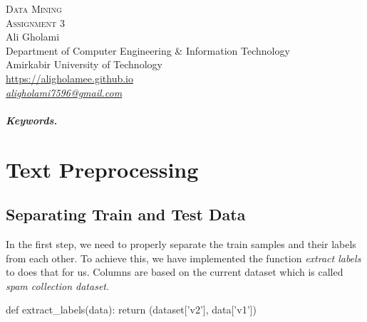 \documentclass[12pt]{article}
\numberwithin{equation}{section}
\numberwithin{table}{section}
\numberwithin{figure}{section}
\begin{document}

\begin{center}
\textsc{\Huge Data Mining} \\[2pt]
	\textsc{\Large Assignment 3}\\
	\vspace{0.5cm}
  Ali Gholami \\[6pt]
  Department of Computer Engineering \& Information Technology\\
  Amirkabir University of Technology  \\[6pt]
  \def\UrlFont{\em}
  \url{https://aligholamee.github.io}\\
\href{mailto:aligholami7596@gmail.com}{\textit{aligholami7596@gmail.com}}
\end{center}

\begin{abstract}

\end{abstract} 

\subparagraph{Keywords.} \textit{}

\section{Text Preprocessing}
\subsection{Separating Train and Test Data}
In the first step, we need to properly separate the train samples and their labels from each other. To achieve this, we have implemented the function \textit{extract labels} to does that for us. Columns are based on the current dataset which is called \textit{spam collection dataset}.

\begin{python}
	def extract_labels(data):
		return (dataset['v2'], data['v1'])
\end{python}
\end{document}
